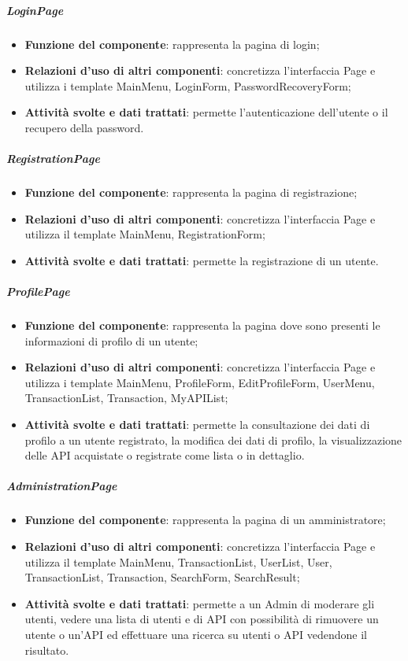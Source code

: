 \subparagraph{LoginPage}
\begin{itemize}
	\item \textbf{Funzione del componente}: rappresenta la pagina di login;
	\item \textbf{Relazioni d’uso di altri componenti}: concretizza l'interfaccia Page e utilizza i template MainMenu, LoginForm, PasswordRecoveryForm;
	\item \textbf{Attività svolte e dati trattati}: permette l'autenticazione dell'utente o il recupero della password.
\end{itemize}

\subparagraph{RegistrationPage}
\begin{itemize}
	\item \textbf{Funzione del componente}: rappresenta la pagina di registrazione;
	\item \textbf{Relazioni d’uso di altri componenti}: concretizza l'interfaccia Page e utilizza il template MainMenu, RegistrationForm;
	\item \textbf{Attività svolte e dati trattati}: permette la registrazione di un utente.
\end{itemize}

\subparagraph{ProfilePage}
\begin{itemize}
	\item \textbf{Funzione del componente}: rappresenta la pagina dove sono presenti le informazioni di profilo di un utente;
	\item \textbf{Relazioni d’uso di altri componenti}: concretizza l'interfaccia Page e utilizza i template MainMenu, ProfileForm, EditProfileForm, UserMenu, TransactionList, Transaction, MyAPIList;
	\item \textbf{Attività svolte e dati trattati}: permette la consultazione dei dati di profilo a un utente registrato, la modifica dei dati di profilo, la visualizzazione delle API acquistate o registrate come lista o in dettaglio.
\end{itemize}

\subparagraph{AdministrationPage}
\begin{itemize}
	\item \textbf{Funzione del componente}: rappresenta la pagina di un amministratore;
	\item \textbf{Relazioni d’uso di altri componenti}: concretizza l'interfaccia Page e utilizza il template MainMenu, TransactionList, UserList, User, TransactionList, Transaction, SearchForm, SearchResult;
	\item \textbf{Attività svolte e dati trattati}: permette a un Admin di moderare gli utenti, vedere una lista di utenti e di API con possibilit\`{a} di rimuovere un utente o un'API ed effettuare una ricerca su utenti o API vedendone il risultato.
\end{itemize}

